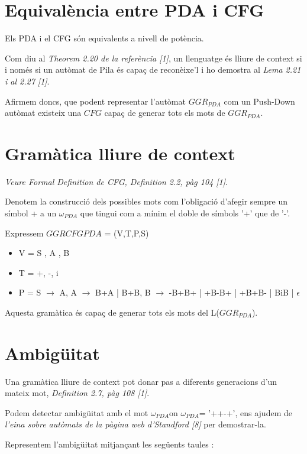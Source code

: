 \documentclass[12pt,a4paper]{report}
\def \wpda{$\omega_{PDA} $}
\def \pdaCFG{$GGRCFG{PDA} $}
\def \pda{$GGR_{PDA} $}
\begin{document}
\section{Equivalència entre PDA i CFG}

Els PDA i el CFG són equivalents a nivell de potència.

Com diu al \textit{Theorem 2.20 de la referència [1]}, un llenguatge és lliure de context si i només si un autòmat de Pila és capaç de reconèixe’l i ho demostra al \textit{Lema 2.21 i al 2.27 [1]}.

Afirmem doncs, que podent representar l’autòmat \pda{} com un Push-Down autòmat existeix una $CFG$ capaç de generar tots els mots de \pda{}.

\section{Gramàtica lliure de context}

\textit{Veure Formal Definition de CFG, Definition 2.2, pàg 104 [1]}.

Denotem la construcció dels possibles mots com l'obligació d’afegir sempre un símbol + a un \wpda{} que tingui com a mínim el doble de símbols '+' que de '-'.

Expressem \pdaCFG{} = (V,T,P,S)

\begin{itemize}
\item V  = {S , A , B}
\item T = {+, -, i }
\item P = {
		S $\rightarrow$ A,
		A $\rightarrow$ B+A | B+B,
		B $\rightarrow$ -B+B+ | +B-B+ | +B+B- | BiB | $\epsilon$
      }
\end{itemize}

Aquesta gramàtica és capaç de generar tots els mots del L(\pda{}).

\section{Ambigüitat}

Una gramàtica lliure de context pot donar pas a diferents generacions d’un mateix mot, \textit{Definition 2.7, pàg 108 [1]}.

Podem detectar ambigüitat amb el mot \wpda on \wpda = '++-+', ens ajudem de \textit{l'eina sobre autòmats de la pàgina web d'Standford [8]} per demostrar-la.

Representem l'ambigüitat mitjançant les següents taules :
\end{document}
